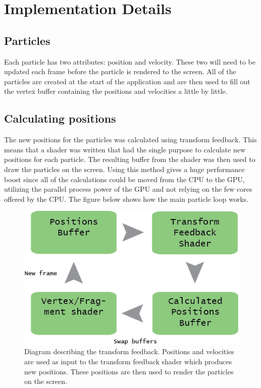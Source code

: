 \documentclass[report]{vgtc}
\begin{document}
	\section{Implementation Details}	
	
	\subsection{Particles}

Each particle has two attributes: position and velocity. These two will need to be updated each frame before the particle is rendered to the screen. All of the particles are created at the start of the application and are then used to fill out the vertex buffer containing the positions and velocities a little by little.


\subsection{Calculating positions}
The new positions for the particles was calculated using transform feedback. This means that a shader was written that had the single purpose to calculate new positions for each particle. The resulting buffer from the shader was then used to draw the particles on the screen. Using this method gives a huge performance boost since all of the calculations could be moved from the CPU to the GPU, utilizing the parallel process power of the GPU and not relying on the few cores offered by the CPU.  The figure below shows how the main particle loop works.
\begin{figure}[H]
\includegraphics[scale=0.47]{img/transform.png}
\caption{Diagram describing the transform feedback. Positions and velocities are used as input to the transform feedback shader which produces new positions. These positions are then used to render the particles on the screen. }
\end{figure}
\pagestyle{empty}
\end{document}
